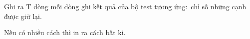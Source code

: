 Ghi ra T dòng mỗi dòng ghi kết quả của bộ test tương ứng: chỉ số những cạnh được giữ lại.

Nếu có nhiều cách thì in ra cách bất kì.